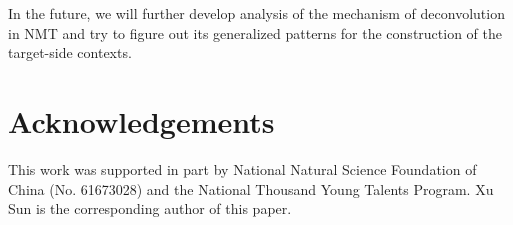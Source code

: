 \documentclass[11pt]{article}
\begin{document}
\begin{CJK}{UTF8}{gbsn}
In the future, we will further develop analysis of the mechanism of deconvolution in NMT and try to figure out its generalized patterns for the construction of the target-side contexts.

\section*{Acknowledgements}
This work was supported in part by National Natural Science Foundation of China (No. 61673028) and the National Thousand Young Talents Program. Xu Sun is the corresponding author of this paper.


















\end{CJK}
\end{document}
